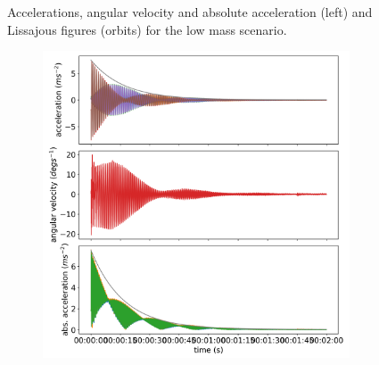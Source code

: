 \documentclass{article}
\begin{document}
\begin{figure}[ht]
\begin{subfigure}[b]{0.45\textwidth}
        \caption{}
        \label{fig:low-mass:orbit}
    \end{subfigure}
    
    \caption{Accelerations, angular velocity and absolute acceleration (left) and Lissajous figures (orbits) for the low mass scenario.}
    \label{fig:low-mass}
\end{figure}


\begin{figure}

    \centering
    \begin{subfigure}[b]{0.45\textwidth}
        \centering
        \includegraphics[width=\textwidth]{results/experiment/medium_mass_acceleration.png}
        \caption{}
        \label{fig:medium-mass:acc}
    \end{subfigure}
    \begin{subfigure}[b]{0.45\textwidth}
        \centering

\end{subfigure}
\end{figure}
\end{document}
